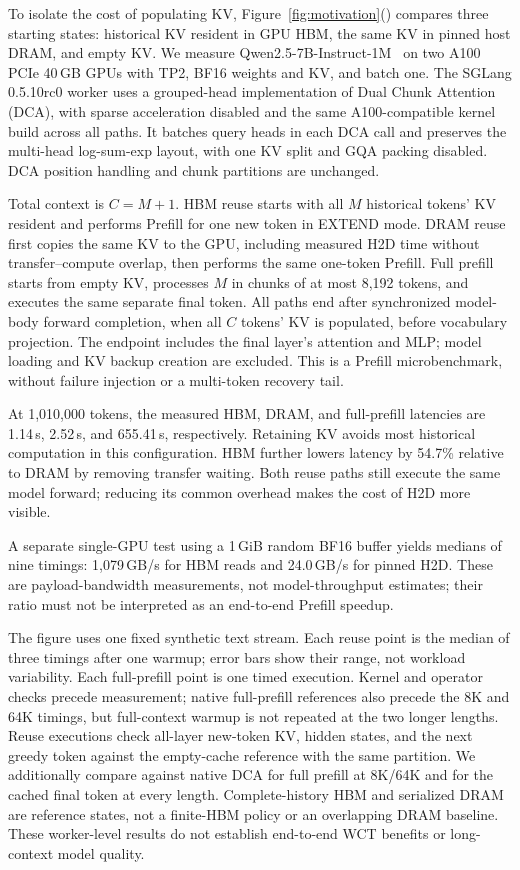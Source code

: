 To isolate the cost of populating KV,
Figure~\ref{fig:motivation}() compares
three starting states: historical KV resident in GPU HBM, the same KV
in pinned host DRAM, and empty KV. We measure
Qwen2.5-7B-Instruct-1M~\cite{qwen2025qwen25oneM} on two A100 PCIe
40\,GB GPUs with TP2, BF16 weights and KV, and batch one. The SGLang
0.5.10rc0 worker uses a grouped-head implementation of Dual Chunk Attention
(DCA), with sparse acceleration disabled and the same A100-compatible
kernel build across all paths. It batches query heads in each DCA call
and preserves the multi-head log-sum-exp layout, with one KV split and
GQA packing disabled. DCA position handling and chunk partitions are
unchanged.

Total context is $C=M+1$. HBM reuse starts with all $M$ historical tokens'
KV resident and performs Prefill for one new token in EXTEND mode.
DRAM reuse first copies the same KV to the GPU, including measured H2D
time without transfer--compute overlap, then performs the same one-token
Prefill. Full prefill starts from empty KV, processes $M$ in chunks of
at most 8,192 tokens, and executes the same separate final token. All
paths end after synchronized model-body forward completion, when all
$C$ tokens' KV is populated, before vocabulary projection. The endpoint
includes the final layer's attention and MLP; model loading and KV backup
creation are excluded. This is a Prefill microbenchmark, without failure
injection or a multi-token recovery tail.

At 1,010,000 tokens, the measured HBM, DRAM, and full-prefill latencies
are 1.14\,s, 2.52\,s, and 655.41\,s, respectively.
Retaining KV avoids most historical computation in this configuration.
HBM further lowers latency by 54.7\% relative to DRAM by removing
transfer waiting. Both reuse paths still execute the same model forward;
reducing its common overhead makes the cost of H2D more visible.

A separate single-GPU test using a 1\,GiB random BF16 buffer yields medians of nine
timings: 1,079\,GB/s for HBM reads and 24.0\,GB/s for pinned H2D. These are
payload-bandwidth measurements, not model-throughput estimates; their
ratio must not be interpreted as an end-to-end Prefill speedup.

The figure uses one fixed synthetic text stream. Each reuse point is the
median of three timings after one warmup; error bars show their range,
not workload variability. Each full-prefill point is one timed execution.
Kernel and operator checks precede measurement; native full-prefill
references also precede the 8K and 64K timings, but full-context warmup
is not repeated at the two longer lengths. Reuse executions check all-layer
new-token KV, hidden states, and the next greedy token against the
empty-cache reference with the same partition. We additionally compare
against native DCA for full prefill at 8K/64K and for the cached final token
at every length. Complete-history HBM and serialized DRAM are reference
states, not a finite-HBM policy or an overlapping DRAM baseline. These
worker-level results do not establish end-to-end WCT benefits or
long-context model quality.

